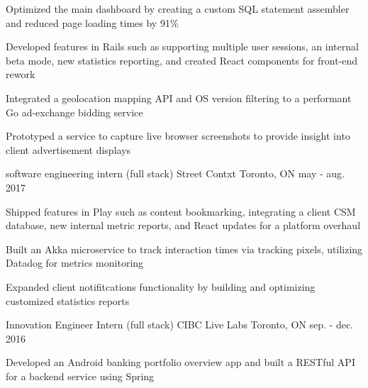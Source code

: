\begin{cventries}
{\begin{cvitems}
        \vspace{1.0mm}
        \item {Optimized the main dashboard by creating a custom SQL statement assembler and reduced page loading times by 91\%}
        \vspace{1.0mm}
        \item {Developed features in Rails such as supporting multiple user sessions, an internal beta mode, new statistics reporting, and created React components for front-end rework}
        \vspace{1.0mm}
        \item {Integrated a geolocation mapping API and OS version filtering to a performant Go ad-exchange bidding service}
        \vspace{1.0mm}
        \item {Prototyped a service to capture live browser screenshots to provide insight into client advertisement displays}
      \end{cvitems}
    }
  \vspace{2.4mm}
  \cventry
    {software engineering intern (full stack)} %
    {Street Contxt} %
    {Toronto, ON} %
    {may - aug. 2017} %
    {
      \begin{cvitems} %
        \vspace{1.0mm}
        \item {Shipped features in Play such as content bookmarking, integrating a client CSM database, new internal metric reports, and React updates for a platform overhaul}
        \vspace{1.0mm}
        \item {Built an Akka microservice to track interaction times via tracking pixels, utilizing Datadog for metrics monitoring}
        \vspace{1.0mm}
        \item {Expanded client notifitcations functionality by building and optimizing customized statistics reports}
      \end{cvitems}
    }
  \vspace{2.4mm}
  \cventry
    {Innovation Engineer Intern (full stack)} %
    {CIBC Live Labs} %
    {Toronto, ON} %
    {sep. - dec. 2016} %
    {
      \begin{cvitems} %
        \vspace{1.0mm}
        \item {Developed an Android banking portfolio overview app and built a RESTful API for a backend service using Spring}

\end{cvitems}}
\end{cventries}
